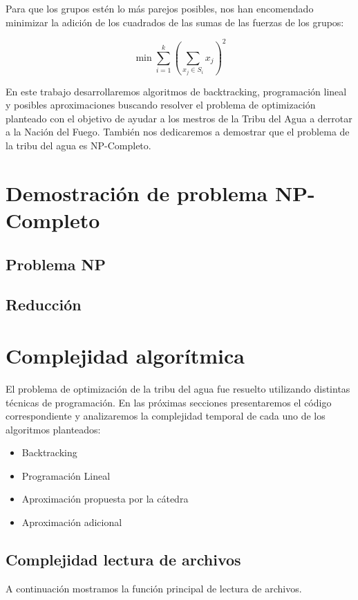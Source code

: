 \documentclass{article}
\begin{document}
Para que los grupos estén lo más parejos posibles, nos han encomendado minimizar la adición de los cuadrados de las sumas de las fuerzas de los grupos:

$$
\min \sum_{i=1}^{k} \left( \sum_{x_j \in S_i} x_j \right)^2
$$

En este trabajo desarrollaremos algoritmos de backtracking, programación lineal y posibles aproximaciones buscando resolver el problema de optimización planteado con el objetivo de ayudar a los mestros de la Tribu del Agua a derrotar a la Nación del Fuego. También nos dedicaremos a demostrar que el problema de la tribu del agua es NP-Completo.

\section{Demostración de problema NP-Completo}
\subsection{Problema NP}
\subsection{Reducción}

\section{Complejidad algorítmica}

El problema de optimización de la tribu del agua fue resuelto utilizando distintas técnicas de programación. En las próximas secciones presentaremos el código correspondiente y analizaremos la complejidad temporal de cada uno de los algoritmos planteados:
\begin{itemize}
    \item Backtracking
    \item Programación Lineal
    \item Aproximación propuesta por la cátedra
    \item Aproximación adicional
\end{itemize}

\subsection{Complejidad lectura de archivos}
A continuación mostramos la función principal de lectura de archivos. 
\inputminted[linenos, firstline=9, lastline=24]{python}{codigo/archivos.py}
\end{document}

